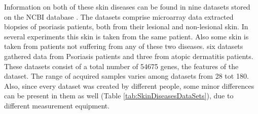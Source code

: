 \documentclass[10pt,a4paper]{report}
\begin{document}
	Information on both of these skin diseases can be found in nine datasets stored on the NCBI database \cite{edgar2002gene}. The datasets comprise microarray data extracted biopsies of psoriasis patients, both from their lesional and non-lesional skin. In several experiments this skin is taken from the same patient. Also some skin is taken from patients not suffering from any of these two diseases. six datasets gathered data from Psoriasis patients and three from atopic dermatitis patients. These datasets consist of a total number of 54675 genes, the features of the dataset. The range of acquired samples varies among datasets from 28 tot 180. Also, since every dataset was created by different people, some minor differences can be present in them as well (Table \ref{tab:SkinDiseasesDataSets}), due to different measurement equipment.
	
\end{document}
